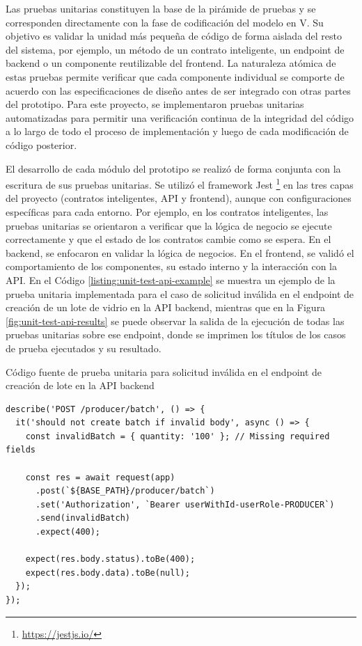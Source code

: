Las pruebas unitarias constituyen la base de la pirámide de pruebas y se corresponden directamente con la fase de codificación del modelo en V. Su objetivo es validar la unidad más pequeña de código de forma aislada del resto del sistema, por ejemplo, un método de un contrato inteligente, un \gls{endpoint} de backend o un componente reutilizable del frontend. La naturaleza atómica de estas pruebas permite verificar que cada componente individual se comporte de acuerdo con las especificaciones de diseño antes de ser integrado con otras partes del prototipo. Para este proyecto, se implementaron pruebas unitarias automatizadas para permitir una verificación continua de la integridad del código a lo largo de todo el proceso de implementación y luego de cada modificación de código posterior.

El desarrollo de cada módulo del prototipo se realizó de forma conjunta con la escritura de sus pruebas unitarias. Se utilizó el framework Jest \footnote{\url{https://jestjs.io/}} en las tres capas del proyecto (contratos inteligentes, API y \gls{frontend}), aunque con configuraciones específicas para cada entorno. Por ejemplo, en los contratos inteligentes, las pruebas unitarias se orientaron a verificar que la lógica de negocio se ejecute correctamente y que el estado de los contratos cambie como se espera. En el \gls{backend}, se enfocaron en validar la lógica de negocios. En el frontend, se validó el comportamiento de los componentes, su estado interno y la interacción con la API. En el Código \ref{listing:unit-test-api-example} se muestra un ejemplo de la prueba unitaria implementada para el caso de solicitud inválida en el endpoint de creación de un lote de vidrio en la API backend, mientras que en la Figura \ref{fig:unit-test-api-results} se puede observar la salida de la ejecución de todas las pruebas unitarias sobre ese endpoint, donde se imprimen los títulos de los casos de prueba ejecutados y su resultado.


\begin{listing}[!tp]
\caption{Código fuente de prueba unitaria para solicitud inválida en el endpoint de creación de lote en la API backend}
\label{listing:unit-test-api-example}
\begin{verbatim}
describe('POST /producer/batch', () => {
  it('should not create batch if invalid body', async () => {
    const invalidBatch = { quantity: '100' }; // Missing required fields

    const res = await request(app)
      .post(`${BASE_PATH}/producer/batch`)
      .set('Authorization', `Bearer userWithId-userRole-PRODUCER`)
      .send(invalidBatch)
      .expect(400);

    expect(res.body.status).toBe(400);
    expect(res.body.data).toBe(null);
  });
});
\end{verbatim}
\end{listing}


